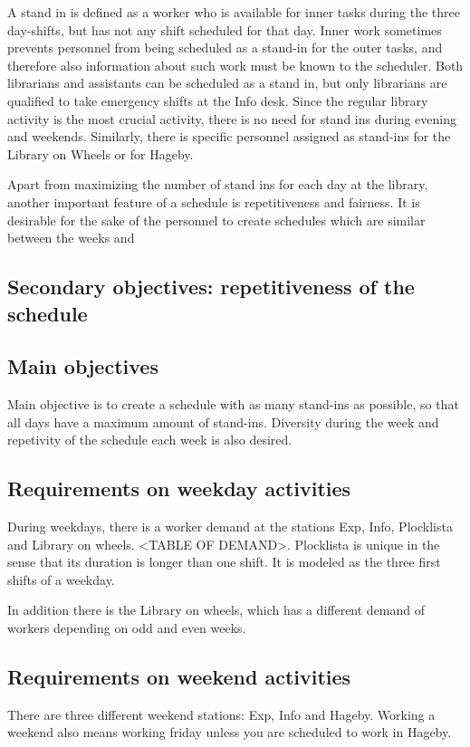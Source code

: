 A stand in is defined as a worker who is available for inner tasks during the three day-shifts, but has not any shift scheduled for that day. Inner work sometimes prevents personnel from being scheduled as a stand-in for the outer tasks, and therefore also information about such work must be known to the scheduler. Both librarians and assistants can be scheduled as a stand in, but only librarians are qualified to take emergency shifts at the Info desk. Since the regular library activity is the most crucial activity, there is no need for stand ins during evening and weekends. Similarly, there is specific personnel assigned as stand-ins for the Library on Wheels or for Hageby.

Apart from maximizing the number of stand ins for each day at the library, another important feature of a schedule is repetitiveness and fairness. It is desirable for the sake of the personnel to create schedules which are similar between the weeks and 






\subsection{Secondary objectives: repetitiveness of the schedule}


\iffalse
\subsection{Main objectives}
Main objective is to create a schedule with as many stand-ins as possible, so that all days have a maximum amount of stand-ins. Diversity during the week and repetivity of the schedule each week is also desired.

\subsection{Requirements on weekday activities}
During weekdays, there is a worker demand at the stations Exp, Info, Plocklista and Library on wheels. <TABLE OF DEMAND>. Plocklista is unique in the sense that its duration is longer than one shift. It is modeled as the three first shifts of a weekday.

In addition there is the Library on wheels, which has a different demand of workers depending on odd and even weeks. 
\subsection{Requirements on weekend activities}
There are three different weekend stations: Exp, Info and Hageby. Working a weekend also means working friday unless you are scheduled to work in Hageby. 
